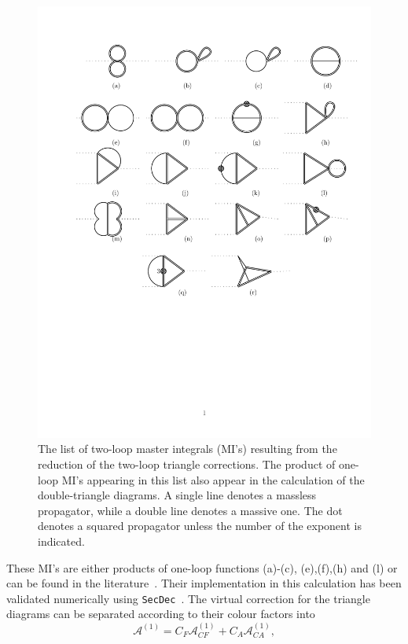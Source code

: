 \begin{figure}[htpb!]
	\begin{center}
		\includegraphics[width=12cm]{./figures/MI}
		\caption{ The list of two-loop master integrals (MI's) resulting from the reduction of the two-loop triangle corrections. The product of one-loop MI's appearing in this list also appear in the calculation of the double-triangle diagrams. A single line denotes a massless propagator, while a double line denotes a massive one. The dot denotes a squared propagator unless the number of the exponent is indicated.}
		\label{fig:trimis}
	\end{center}
\end{figure}
These MI's are either products of one-loop functions (a)-(c), (e),(f),(h) and (l) or can be found in the literature~\cite{Bonciani:2003hc,Aglietti:2006tp}. Their implementation in this calculation has been validated numerically using \texttt{SecDec}~\cite{Borowka:2013cma,Borowka:2015mxa}.  
The virtual correction for the triangle diagrams can be separated according to their colour factors into
\begin{equation}
	\mathcal A ^{(1)}   = C_F \mathcal A_{CF} ^{(1)}  + C_A \mathcal A_{CA} ^{(1)},
\end{equation}
